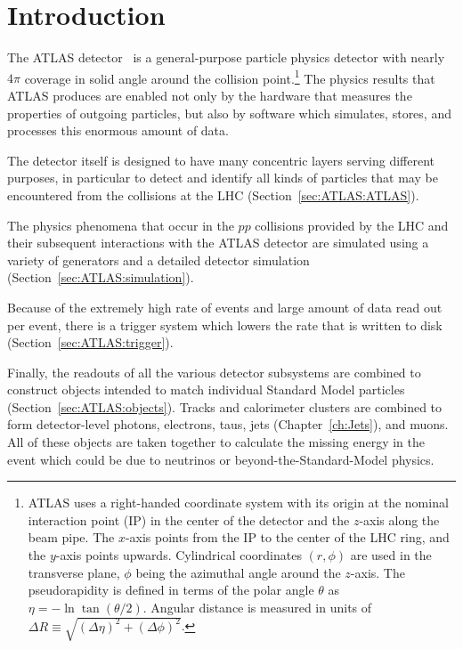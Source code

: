 \newcommand{\AtlasCoordFootnote}{
ATLAS uses a right-handed coordinate system with its origin at the nominal interaction point (IP)
in the center of the detector and the $z$-axis along the beam pipe.
The $x$-axis points from the IP to the center of the LHC ring,
and the $y$-axis points upwards.
Cylindrical coordinates $(r,\phi)$ are used in the transverse plane, 
$\phi$ being the azimuthal angle around the $z$-axis.
The pseudorapidity is defined in terms of the polar angle $\theta$ as $\eta = -\ln \tan(\theta/2)$.
Angular distance is measured in units of $\Delta R \equiv \sqrt{(\Delta\eta)^{2} + (\Delta\phi)^{2}}$.}

\section{Introduction}
The ATLAS detector~\cite{PERF-2007-01} is a general-purpose particle physics detector 
with nearly $4\pi$ coverage in solid angle around the collision point.\footnote{\AtlasCoordFootnote}
The physics results that ATLAS produces are enabled not only by the hardware that measures the properties of outgoing particles, but also by software which simulates, stores, and processes this enormous amount of data.

The detector itself is designed to have many concentric layers serving different purposes, in particular to detect and identify all kinds of particles that may be encountered from the collisions at the LHC (Section~\ref{sec:ATLAS:ATLAS}).

The physics phenomena that occur in the $pp$ collisions provided by the LHC and their subsequent interactions with the ATLAS detector are simulated using a variety of generators and a detailed detector simulation (Section~\ref{sec:ATLAS:simulation}).

Because of the extremely high rate of events and large amount of data read out per event, there is a trigger system which lowers the rate that is written to disk (Section~\ref{sec:ATLAS:trigger}).

Finally, the readouts of all the various detector subsystems are combined to construct objects intended to match individual Standard Model particles (Section~\ref{sec:ATLAS:objects}).
Tracks and calorimeter clusters are combined to form detector-level photons, electrons, taus, jets (Chapter~\ref{ch:Jets}), and muons.
All of these objects are taken together to calculate the missing energy in the event which could be due to neutrinos or beyond-the-Standard-Model physics.

